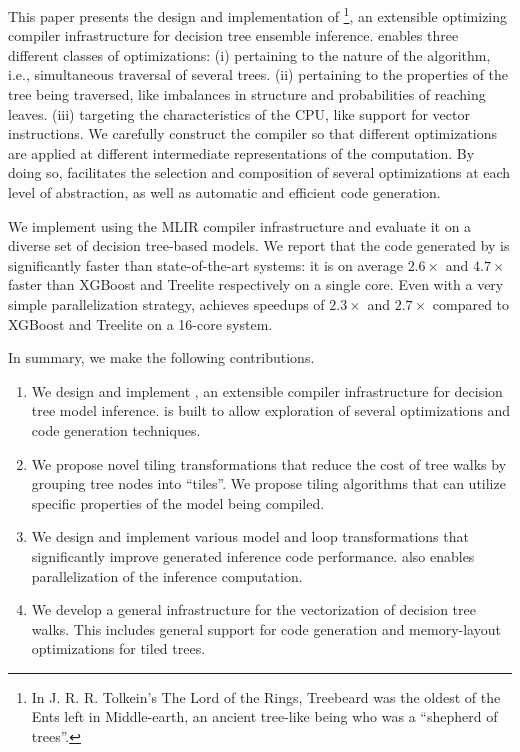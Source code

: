 This paper presents the design and implementation of \Treebeard{}\footnote{In 
J. R. R. Tolkein's The Lord of the Rings, Treebeard was the oldest of the Ents left in Middle-earth, an 
ancient tree-like being who was a ``shepherd of trees''.}, an extensible optimizing compiler infrastructure for decision tree ensemble
inference. \Treebeard{} enables three different classes of optimizations: (i) pertaining to the nature of the algorithm, i.e., simultaneous traversal of several trees.
(ii) pertaining to the properties of the tree being traversed, like imbalances in structure and probabilities of reaching leaves. 
(iii) targeting the characteristics of the CPU, like support for vector instructions. 
We carefully construct the compiler so that different optimizations are applied at different intermediate
representations of the computation. By doing so, \Treebeard{} facilitates the selection and composition of
several optimizations at each level of abstraction, as well as automatic and efficient code generation.

We implement \Treebeard{} using the MLIR compiler infrastructure\cite{MLIR} and evaluate it 
on a diverse set of decision tree-based models. We report that the code generated by
\Treebeard{} is significantly faster than state-of-the-art systems: it is on average
$2.6\times$ and $4.7\times$ faster than XGBoost and Treelite respectively on a single core. 
Even with a very simple parallelization strategy, \Treebeard{} achieves speedups of $2.3\times$ and $2.7\times$
compared to XGBoost and Treelite on a 16-core system.

In summary, we make the following contributions.
\begin{enumerate}
\item We design and implement \Treebeard{}, an extensible compiler infrastructure for decision tree model inference. 
\Treebeard{} is built to allow exploration of several optimizations and code generation techniques. %
\item We propose novel tiling transformations that reduce the cost of tree walks by grouping tree nodes into ``tiles''.
We propose tiling algorithms that can utilize specific properties of the model being compiled.
\item We design and implement various model and loop transformations that significantly improve generated inference
code performance. \Treebeard{} also enables parallelization of the inference computation.
\item We develop a general infrastructure for the vectorization of decision tree walks.
This includes general support for code generation and memory-layout optimizations for tiled trees.
\end{enumerate}
